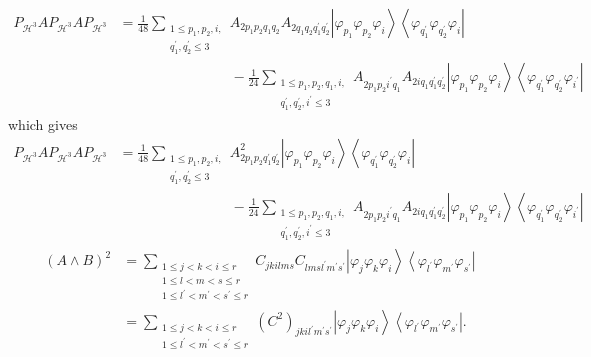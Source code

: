 \documentclass[aps,preprint]{revtex4}%
\begin{document}
\begin{align}
P_{\mathcal{H}^{3}}AP_{\mathcal{H}^{3}}AP_{\mathcal{H}^{3}}  &  =\frac{1}%
{48}\sum_{\substack{1\leq p_{1},p_{2},i,\\q_{1}^{\prime},q_{2}^{\prime}\leq
3}}A_{2p_{1}p_{2}q_{1}q_{2}}A_{2q_{1}q_{2}q_{1}^{\prime}q_{2}^{\prime}%
}\left\vert \varphi_{p_{1}}\varphi_{p_{2}}\varphi_{i}\right\rangle
\left\langle \varphi_{q_{1}^{\prime}}\varphi_{q_{2}^{\prime}}\varphi
_{i}\right\vert \\
&  \qquad\qquad\qquad\qquad-\frac{1}{24}\sum_{\substack{1\leq p_{1}%
,p_{2},q_{1},i,\\q_{1}^{\prime},q_{2}^{\prime},i^{\prime}\leq3}}A_{2p_{1}%
p_{2}i^{\prime}q_{1}}A_{2iq_{1}q_{1}^{\prime}q_{2}^{\prime}}\left\vert
\varphi_{p_{1}}\varphi_{p_{2}}\varphi_{i}\right\rangle \left\langle
\varphi_{q_{1}^{\prime}}\varphi_{q_{2}^{\prime}}\varphi_{i^{\prime}%
}\right\vert
\end{align}
which gives%
\begin{align}
P_{\mathcal{H}^{3}}AP_{\mathcal{H}^{3}}AP_{\mathcal{H}^{3}}  &  =\frac{1}%
{48}\sum_{\substack{1\leq p_{1},p_{2},i,\\q_{1}^{\prime},q_{2}^{\prime}\leq
3}}A_{2p_{1}p_{2}q_{1}^{\prime}q_{2}^{\prime}}^{2}\left\vert \varphi_{p_{1}%
}\varphi_{p_{2}}\varphi_{i}\right\rangle \left\langle \varphi_{q_{1}^{\prime}%
}\varphi_{q_{2}^{\prime}}\varphi_{i}\right\vert \\
&  \qquad\qquad\qquad\qquad-\frac{1}{24}\sum_{\substack{1\leq p_{1}%
,p_{2},q_{1},i,\\q_{1}^{\prime},q_{2}^{\prime},i^{\prime}\leq3}}A_{2p_{1}%
p_{2}i^{\prime}q_{1}}A_{2iq_{1}q_{1}^{\prime}q_{2}^{\prime}}\left\vert
\varphi_{p_{1}}\varphi_{p_{2}}\varphi_{i}\right\rangle \left\langle
\varphi_{q_{1}^{\prime}}\varphi_{q_{2}^{\prime}}\varphi_{i^{\prime}%
}\right\vert
\end{align}%
\begin{align}
\left(  A\wedge B\right)  ^{2}  &  =\sum_{\substack{1\leq j<k<i\leq r\\1\leq
l<m<s\leq r\\1\leq l^{\prime}<m^{\prime}<s^{\prime}\leq r}}C_{jkilms}%
C_{lmsl^{\prime}m^{\prime}s^{\prime}}\left\vert \varphi_{j}\varphi_{k}%
\varphi_{i}\right\rangle \left\langle \varphi_{l^{\prime}}\varphi_{m^{\prime}%
}\varphi_{s^{\prime}}\right\vert \nonumber\\
&  =\sum_{\substack{1\leq j<k<i\leq r\\1\leq l^{\prime}<m^{\prime}<s^{\prime
}\leq r}}\left(  C^{2}\right)  _{jkil^{\prime}m^{\prime}s^{\prime}}\left\vert
\varphi_{j}\varphi_{k}\varphi_{i}\right\rangle \left\langle \varphi
_{l^{\prime}}\varphi_{m^{\prime}}\varphi_{s^{\prime}}\right\vert .
\end{align}
\end{document}
